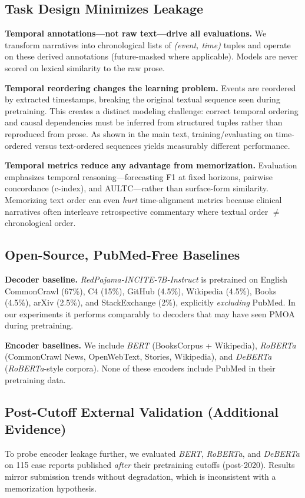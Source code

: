 \subsection{Task Design Minimizes Leakage}

\textbf{Temporal annotations—not raw text—drive all evaluations.}
We transform narratives into chronological lists of \emph{(event, time)} tuples and operate on these derived annotations (future-masked where applicable). Models are never scored on lexical similarity to the raw prose.

\textbf{Temporal reordering changes the learning problem.}
Events are reordered by extracted timestamps, breaking the original textual sequence seen during pretraining. This creates a distinct modeling challenge: correct temporal ordering and causal dependencies must be inferred from structured tuples rather than reproduced from prose. As shown in the main text, training/evaluating on time-ordered versus text-ordered sequences yields measurably different performance.

\textbf{Temporal metrics reduce any advantage from memorization.}
Evaluation emphasizes temporal reasoning—forecasting F1 at fixed horizons, pairwise concordance (c-index), and AULTC—rather than surface-form similarity. Memorizing text order can even \emph{hurt} time-alignment metrics because clinical narratives often interleave retrospective commentary where textual order $\neq$ chronological order.

\subsection{Open-Source, PubMed-Free Baselines}

\textbf{Decoder baseline.} 
\emph{RedPajama-INCITE-7B-Instruct} is pretrained on English CommonCrawl (67\%), C4 (15\%), GitHub (4.5\%), Wikipedia (4.5\%), Books (4.5\%), arXiv (2.5\%), and StackExchange (2\%), explicitly \emph{excluding} PubMed. In our experiments it performs comparably to decoders that may have seen PMOA during pretraining.

\textbf{Encoder baselines.} 
We include \emph{BERT} (BooksCorpus + Wikipedia), \emph{RoBERTa} (CommonCrawl News, OpenWebText, Stories, Wikipedia), and \emph{DeBERTa} (\textit{RoBERTa}-style corpora). None of these encoders include PubMed in their pretraining data.


\subsection{Post-Cutoff External Validation (Additional Evidence)}
To probe encoder leakage further, we evaluated \textit{BERT}, \textit{RoBERTa}, and \textit{DeBERTa} on 115 case reports published \emph{after} their pretraining cutoffs (post-2020). Results mirror submission trends without degradation, which is inconsistent with a memorization hypothesis.

